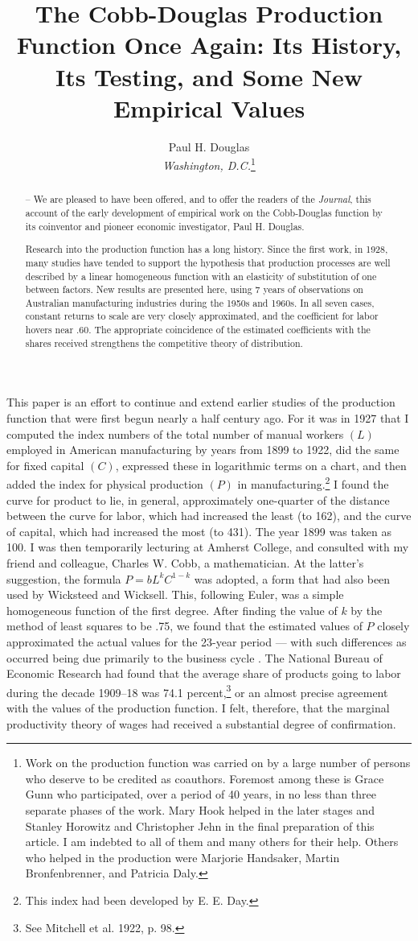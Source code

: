 \documentclass{article}
\title{The Cobb-Douglas Production Function Once Again: Its History, Its Testing, and Some New Empirical Values}
\author{
	Paul H. Douglas\\
	\emph{Washington, D.C.}\thanks{Work on the production function was carried on by a large number of persons who deserve to be credited as coauthors. Foremost among these is Grace Gunn who participated, over a period of 40 years, in no less than three separate phases of the work. Mary Hook helped in the later stages and Stanley Horowitz and Christopher Jehn in the final preparation of this article. I am indebted to all of them and many others for their help. Others who helped in the production were Marjorie Handsaker, Martin Bronfenbrenner, and Patricia Daly.}
}
\begin{document}
\renewcommand{\abstractname}{Editors' Note.}
\maketitle

\begin{abstract}
-- We are pleased to have been offered, and to offer the readers of the \emph{Journal}, this account of the early development of empirical work on the Cobb-Douglas function by its coinventor and pioneer economic investigator, Paul H. Douglas.

Research into the production function has a long history. Since the first work, in 1928, many studies have tended to support the hypothesis that production processes are well described by a linear homogeneous function with an elasticity of substitution of one between factors. New results are presented here, using 7 years of observations on Australian manufacturing industries during the 1950s and 1960s. In all seven cases, constant returns to scale are very closely approximated, and the coefficient for labor hovers near .60. The appropriate coincidence of the estimated coefficients with the shares received strengthens the competitive theory of distribution.
\end{abstract}


This paper is an effort to continue and extend earlier studies of the production function that were first begun nearly a half century ago. For it was in 1927 that I computed the index numbers of the total number of manual workers \((L)\) employed in American manufacturing by years from 1899 to 1922, did the same for fixed capital \((C)\), expressed these in logarithmic terms on a chart, and then added the index for physical %
production \((P)\) in manufacturing.\footnote{This index had been developed by E. E. Day.} I found the curve for product to lie, in general, approximately one-quarter of the distance between the curve for labor, which had increased the least (to 162), and the curve of capital, which had increased the most (to 431). The year 1899 was taken as 100. I was then temporarily lecturing at Amherst College, and consulted with my friend and colleague, Charles W. Cobb, a mathematician. At the latter's suggestion, the formula \(P=bL^kC^{1-k}\) was adopted, a form that had also been used by Wicksteed and Wicksell. This, following Euler, was a simple homogeneous function of the first degree. After finding the value of \(k\) by the method of least squares to be .75, we found that the estimated values of \(P\) closely approximated the actual values for the 23-year period --- with such differences as occurred being due primarily to the business cycle \cite[pp. 139--65]{Douglas:1}. The National Bureau of Economic Research had found that the average share of products going to labor during the decade 1909--18 was 74.1 percent,\footnote{See Mitchell et al. 1922, p. 98.} or an almost precise agreement with the values of the production function. I felt, therefore, that the marginal productivity theory of wages had received a substantial degree of confirmation.
\end{document}

